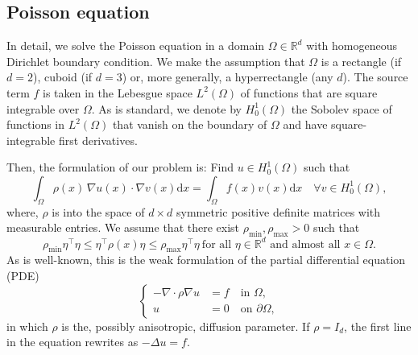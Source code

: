 \documentclass[onefignum,onetabnum]{siamart251216}
\begin{document}
\subsection{Poisson equation}
In detail, we solve the Poisson equation in a domain $\Omega \in \mathbb{R}^d$ with homogeneous Dirichlet boundary condition. We make the assumption that $\Omega$ is a rectangle (if $d=2$), cuboid (if $d=3$) or, more generally, a hyperrectangle (any $d$). The source term $f$ is taken in the Lebesgue space $L^2(\Omega)$ of functions that are square integrable over $\Omega$. As is standard, we denote by $H_0^1(\Omega)$ the Sobolev space of functions in $L^2(\Omega)$ that vanish on the boundary of $\Omega$ and have square-integrable first derivatives. 

Then, the formulation of our problem is: Find $u \in H_0^1(\Omega)$ such that 
\begin{equation}
\label{eq:varf}
\int_\Omega \rho(x) \, \nabla u(x) \cdot \nabla v(x)  \mathrm d x = \int_\Omega f(x) v(x) \mathrm d x  \quad \forall v \in H_0^1(\Omega),
\end{equation}
where, $\rho$ is into the space of ${d \times d}$ symmetric positive definite matrices with measurable entries. We assume that there exist $\rho_{\min},\rho_{\max}>0$ such that
\begin{equation}
\label{eq:assumption-rho}
\rho_{\min} \eta^\top \eta \leq \eta^\top \rho(x)  \eta \leq \rho_{\max} \eta^\top \eta ~ \text{for all } \eta \in \mathbb{R}^d \text{ and almost all } x \in \Omega. 
\end{equation}
As is well-known, this is the weak formulation of the partial differential equation (PDE)
\begin{equation}
    \label{eq:pde}
\left\{
    \begin{aligned}
- \nabla \cdot \rho \nabla u &= f \quad \text{in } \Omega, \\
u &= 0 \quad \text{on } \partial \Omega,
\end{aligned}
\right.
\end{equation}
in which $\rho$ is the, possibly anisotropic, diffusion parameter. If $\rho = I_{d}$, the first line in the equation rewrites as $- \Delta u = f$.
\end{document}

